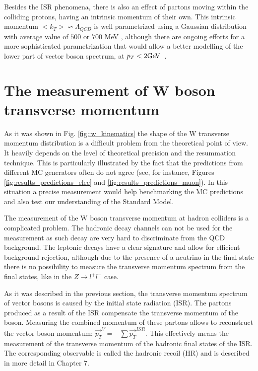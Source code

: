  Besides the ISR phenomena, there is also an effect of partons moving within the colliding protons, having an intrinsic momentum of their own. This intrinsic momentum $<k_T>\backsim \Lambda_{QCD}$ is well parametrized using a Gaussian distribution with average value of $500$ \cite{PhysRevD.100.074027} or $700$ MeV  \cite{Ellis:1991qj}, although there are ongoing efforts for a more sophisticated parametrization that would allow a better modelling of the lower part of vector boson spectrum, at $p_T<2\text{Ge\kern -0.1em V}$~\cite{HAUTMANN2020135478}. \\
 
 
\section{The measurement of W boson transverse momentum}
As it was shown in Fig. \ref{fig::w_kinematics} the shape of the W transverse momentum distribution is a difficult problem from the theoretical point of view. It heavily depends on the level of theoretical precision and the resummation technique. This is particularly illustrated by the fact that the predictions from different MC generators often do not agree (see, for instance, Figures \ref{fig:results_predictions_elec} and \ref{fig:results_predictions_muon}). In this situation a precise measurement would help benchmarking the MC predictions and also test our understanding of the Standard Model.

The measurement of the W boson transverse momentum at hadron colliders is a complicated problem. The hadronic decay channels can not be used for the measurement as such decay are very hard to discriminate from the QCD background. The leptonic decays have a clear signature and allow for efficient background rejection, although due to the presence of a neutrino in the final state there is no possibility to measure the transverse momentum spectrum from the final states, like in the $Z\rightarrow l^+ l^-$ case.

As it was described in the previous section, the transverse momentum spectrum of vector bosons is caused by the initial state radiation (ISR). The partons produced as a result of the ISR compensate the transverse momentum of the boson. Measuring the combined momentum of these partons allows to reconstruct the vector boson momentum: $\vec{p_T}^{V} = -\sum \vec{p_T}^{ISR}$. This effectively means the measurement of the transverse momentum of the hadronic final states of the ISR. The corresponding observable is called the hadronic recoil (HR) and is described in more detail in Chapter 7. 

